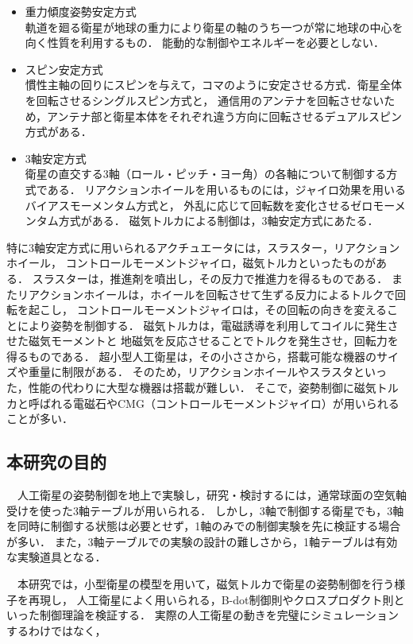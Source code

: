 \begin{itemize}
    \item 重力傾度姿勢安定方式\\
    軌道を廻る衛星が地球の重力により衛星の軸のうち一つが常に地球の中心を向く性質を利用するもの．
    能動的な制御やエネルギーを必要としない．
    \item スピン安定方式\\
    慣性主軸の回りにスピンを与えて，コマのように安定させる方式．衛星全体を回転させるシングルスピン方式と，
    通信用のアンテナを回転させないため，アンテナ部と衛星本体をそれぞれ違う方向に回転させるデュアルスピン方式がある．
    \item 3軸安定方式\\
    衛星の直交する3軸（ロール・ピッチ・ヨー角）の各軸について制御する方式である．
    リアクションホイールを用いるものには，ジャイロ効果を用いるバイアスモーメンタム方式と，
    外乱に応じて回転数を変化させるゼロモーメンタム方式がある．
    磁気トルカによる制御は，3軸安定方式にあたる．
\end{itemize}

特に3軸安定方式に用いられるアクチュエータには，スラスター，リアクションホイール，
コントロールモーメントジャイロ，磁気トルカといったものがある．
スラスターは，推進剤を噴出し，その反力で推進力を得るものである．
またリアクションホイールは，ホイールを回転させて生ずる反力によるトルクで回転を起こし，
コントロールモーメントジャイロは，その回転の向きを変えることにより姿勢を制御する．
磁気トルカは，電磁誘導を利用してコイルに発生させた磁気モーメントと
地磁気を反応させることでトルクを発生させ，回転力を得るものである．
超小型人工衛星は，その小ささから，搭載可能な機器のサイズや重量に制限がある．
そのため，リアクションホイールやスラスタといった，性能の代わりに大型な機器は搭載が難しい．
そこで，姿勢制御に磁気トルカと呼ばれる電磁石やCMG（コントロールモーメントジャイロ）が用いられることが多い．



\subsection{本研究の目的}
　人工衛星の姿勢制御を地上で実験し，研究・検討するには，通常球面の空気軸受けを使った3軸テーブルが用いられる．
しかし，3軸で制御する衛星でも，3軸を同時に制御する状態は必要とせず，1軸のみでの制御実験を先に検証する場合が多い．
また，3軸テーブルでの実験の設計の難しさから，1軸テーブルは有効な実験道具となる．

　本研究では，小型衛星の模型を用いて，磁気トルカで衛星の姿勢制御を行う様子を再現し，
人工衛星によく用いられる，B-dot制御則やクロスプロダクト則といった制御理論を検証する．
実際の人工衛星の動きを完璧にシミュレーションするわけではなく，

